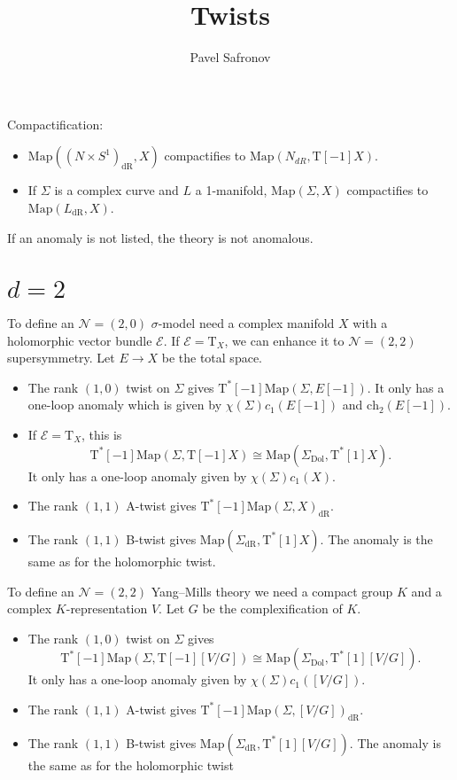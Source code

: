 \documentclass[12pt]{amsart}
\newcommand{\cE}{\mathcal{E}}
\newcommand{\cN}{\mathcal{N}}
\newcommand{\T}{\mathrm{T}}
\newcommand{\ch}{\mathrm{ch}}
\newcommand{\Dol}{\mathrm{Dol}}
\newcommand{\dR}{\mathrm{dR}}
\newcommand{\Map}{\mathrm{Map}}
\theoremstyle{definition}
\theoremstyle{remark}
\begin{document}
\title{Twists}
\author{Pavel Safronov}
\maketitle

Compactification:
\begin{itemize}
\item $\Map((N\times S^1)_{\dR}, X)$ compactifies to $\Map(N_{dR}, \T[-1] X)$.

\item If $\Sigma$ is a complex curve and $L$ a 1-manifold, $\Map(\Sigma, X)$ compactifies to $\Map(L_{\dR}, X)$.
\end{itemize}

If an anomaly is not listed, the theory is not anomalous.

\section{$d=2$}

To define an $\cN=(2, 0)$ $\sigma$-model need a complex manifold $X$ with a holomorphic vector bundle $\cE$. If $\cE=\T_X$, we can enhance it to $\cN=(2, 2)$ supersymmetry. Let $E\rightarrow X$ be the total space.

\begin{itemize}
\item The rank $(1, 0)$ twist on $\Sigma$ gives $\T^*[-1]\Map(\Sigma, E[-1])$. It only has a one-loop anomaly which is given by $\chi(\Sigma) c_1(E[-1])$ and $\ch_2(E[-1])$.

\item If $\cE=\T_X$, this is
\[\T^*[-1]\Map(\Sigma, \T[-1]X)\cong \Map(\Sigma_{\Dol}, \T^*[1] X).\]
It only has a one-loop anomaly given by $\chi(\Sigma) c_1(X)$.

\item The rank $(1, 1)$ A-twist gives $\T^*[-1]\Map(\Sigma, X)_{\dR}$.

\item The rank $(1, 1)$ B-twist gives $\Map(\Sigma_{\dR}, \T^*[1] X)$. The anomaly is the same as for the holomorphic twist.
\end{itemize}

To define an $\cN=(2, 2)$ Yang--Mills theory we need a compact group $K$ and a complex $K$-representation $V$. Let $G$ be the complexification of $K$.

\begin{itemize}
\item The rank $(1, 0)$ twist on $\Sigma$ gives
\[\T^*[-1]\Map(\Sigma, \T[-1][V/G])\cong \Map(\Sigma_{\Dol}, \T^*[1][V/G]).\]
It only has a one-loop anomaly given by $\chi(\Sigma) c_1([V/G])$.

\item The rank $(1, 1)$ A-twist gives $\T^*[-1]\Map(\Sigma, [V/G])_{\dR}$.

\item The rank $(1, 1)$ B-twist gives $\Map(\Sigma_{\dR}, \T^*[1] [V/G])$. The anomaly is the same as for the holomorphic twist
\end{itemize}
\end{document}
